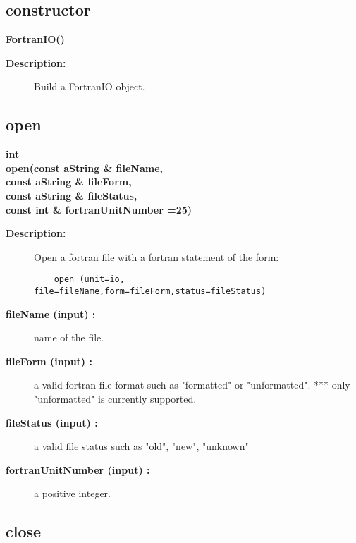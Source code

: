 \subsection{constructor}
 
\newlength{\FortranIOIncludeArgIndent}
\begin{flushleft} \textbf{%
\settowidth{\FortranIOIncludeArgIndent}{FortranIO(}%
FortranIO()
}\end{flushleft}
\begin{description}
\item[{\bf Description:}] 
   Build a FortranIO object. 
\end{description}
\subsection{open}
 
\begin{flushleft} \textbf{%
int   \\ 
\settowidth{\FortranIOIncludeArgIndent}{open(}%
open(const aString \& fileName, \\ 
\hspace{\FortranIOIncludeArgIndent}const aString \& fileForm, \\ 
\hspace{\FortranIOIncludeArgIndent}const aString \& fileStatus,\\ 
\hspace{\FortranIOIncludeArgIndent}const int \& fortranUnitNumber  =25)
}\end{flushleft}
\begin{description}
\item[{\bf Description:}] 
   Open a fortran file with a fortran statement of the form:
 \begin{verbatim}
    open (unit=io, file=fileName,form=fileForm,status=fileStatus)
 \end{verbatim}
\item[{\bf fileName (input) :}]  name of the file.
\item[{\bf fileForm (input) :}]  a valid fortran file format such as "formatted" or "unformatted". *** only "unformatted"
  is currently supported.
\item[{\bf fileStatus (input) :}]  a valid file status such as "old", "new", "unknown"
\item[{\bf fortranUnitNumber (input) :}]  a positive integer.
\end{description}
\subsection{close}
 
